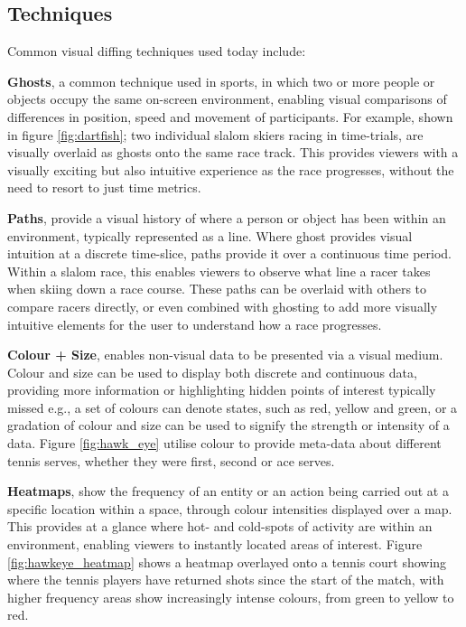 \subsection{Techniques} %
\label{sub:techniques}

Common visual diffing techniques used today include:

\textbf{Ghosts}\footnotemark, a common technique used in sports, in which two or more people or objects occupy the same on-screen environment, enabling visual comparisons of differences in position, speed and movement of participants. For example, shown in figure \ref{fig:dartfish}; two individual slalom skiers racing in time-trials, are visually overlaid as ghosts onto the same race track. This provides viewers with a visually exciting but also intuitive experience as the race progresses, without the need to resort to just time metrics. 


\textbf{Paths}, provide a visual history of where a person or object has been within an environment, typically represented as a line. Where ghost provides visual intuition at a discrete time-slice, paths provide it over a continuous time period. Within a slalom race, this enables viewers to observe what line a racer takes when skiing down a race course. These paths can be overlaid with others to compare racers directly, or even combined with ghosting to add more visually intuitive elements for the user to understand how a race progresses.

\textbf{Colour + Size}, enables non-visual data to be presented via a visual medium. Colour and size can be used to display both discrete and continuous data, providing more information or highlighting hidden points of interest typically missed e.g., a set of colours can denote states, such as red, yellow and green, or a gradation of colour and size can be used to signify the strength or intensity of a data. Figure \ref{fig:hawk_eye} utilise colour to provide meta-data about different tennis serves, whether they were first, second or ace serves. 


\textbf{Heatmaps}, show the frequency of an entity or an action being carried out at a specific location within a space, through colour intensities displayed over a map. This provides at a glance where hot- and cold-spots of activity are within an environment, enabling viewers to instantly located areas of interest. Figure \ref{fig:hawkeye_heatmap} shows a heatmap overlayed onto a tennis court showing where the tennis players have returned shots since the start of the match, with higher frequency areas show increasingly intense colours, from green to yellow to red.

